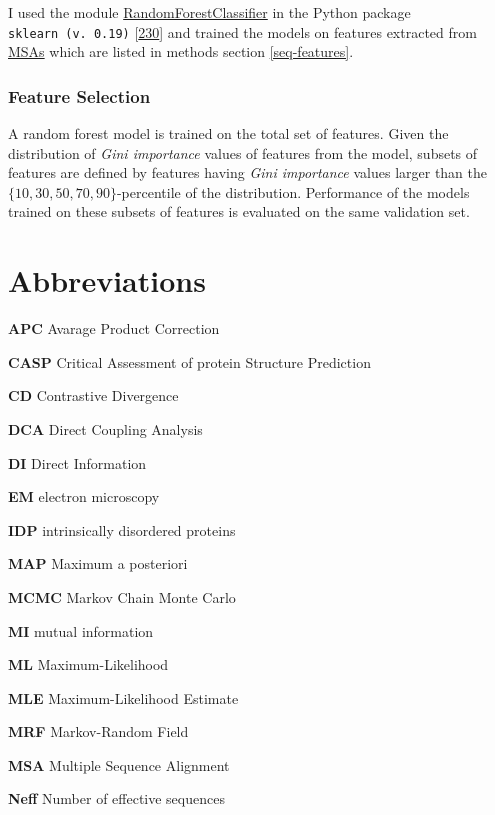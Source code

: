 \documentclass[11pt,a4paper,twoside]{book}
\theoremstyle{definition}
\theoremstyle{definition}
\theoremstyle{remark}
\begin{document}
I used the module
\href{http://scikit-learn.org/stable/modules/generated/sklearn.ensemble.RandomForestClassifier.html\#sklearn.ensemble.RandomForestClassifier}{RandomForestClassifier}
in the Python package \texttt{sklearn\ (v.\ 0.19)}
{[}\protect\hyperlink{ref-Pedregosa2011}{230}{]} and trained the models
on features extracted from \protect\hyperlink{abbrev}{MSAs} which are
listed in methods section \ref{seq-features}.

\subsection{Feature Selection}\label{rf-feature-selection}

A random forest model is trained on the total set of features. Given the
distribution of \emph{Gini importance} values of features from the
model, subsets of features are defined by features having \emph{Gini
importance} values larger than the \(\{10, 30, 50, 70, 90\}\)-percentile
of the distribution. Performance of the models trained on these subsets
of features is evaluated on the same validation set.

\appendix


\hypertarget{abbrev}{\chapter{Abbreviations}\label{abbrev}}

\textbf{APC} Avarage Product Correction

\textbf{CASP} Critical Assessment of protein Structure Prediction

\textbf{CD} Contrastive Divergence

\textbf{DCA} Direct Coupling Analysis

\textbf{DI} Direct Information

\textbf{EM} electron microscopy

\textbf{IDP} intrinsically disordered proteins

\textbf{MAP} Maximum a posteriori

\textbf{MCMC} Markov Chain Monte Carlo

\textbf{MI} mutual information

\textbf{ML} Maximum-Likelihood

\textbf{MLE} Maximum-Likelihood Estimate

\textbf{MRF} Markov-Random Field

\textbf{MSA} Multiple Sequence Alignment

\textbf{Neff} Number of effective sequences
\end{document}
